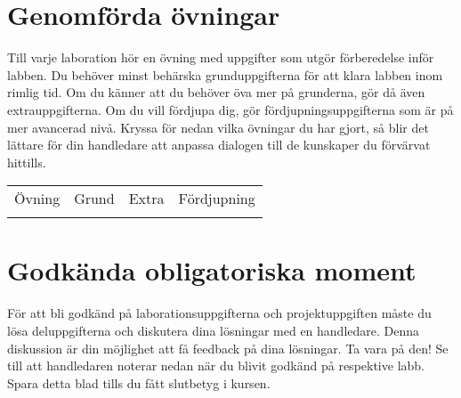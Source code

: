 
\label{progress-protocoll}


\section*{Genomförda övningar}

\vspace{1em}\noindent
{Till varje laboration hör en övning med uppgifter som utgör förberedelse inför labben. Du behöver minst behärska grunduppgifterna för att klara labben inom rimlig tid. Om du känner att du behöver öva mer på grunderna, gör då även extrauppgifterna. Om du vill fördjupa dig, gör fördjupningsuppgifterna som är på mer avancerad nivå. Kryssa för nedan vilka övningar du har gjort, så blir det lättare för din handledare att anpassa dialogen till de kunskaper du förvärvat hittills.}

\newcommand{\TickBox}{\raisebox{-.50ex}{\Large$\square$}}
\newcommand{\ExeRow}[1]{\hyperref[section:exe:#1]{\texttt{#1}} & \TickBox  &  \TickBox &  \TickBox  \\ \addlinespace }

\begin{table}[h]
\centering
\vspace{2em}
\begin{tabular}{lccc}
\toprule \addlinespace
{\sffamily Övning} &
{\sffamily Grund} &
{\sffamily Extra} &
{\sffamily Fördjupning}\\ \addlinespace \midrule \\[-0.7em]

\bottomrule
\end{tabular}
\end{table}

\newpage

\section*{Godkända obligatoriska moment}

\vspace{1em}\noindent
För att bli godkänd på laborationsuppgifterna och projektuppgiften måste du lösa deluppgifterna och diskutera dina lösningar med en handledare. Denna diskussion är din möjlighet att få feedback på dina lösningar. Ta vara på den!
Se till att handledaren noterar nedan när du blivit godkänd på respektive labb. Spara detta blad tills du fått slutbetyg i kursen.



